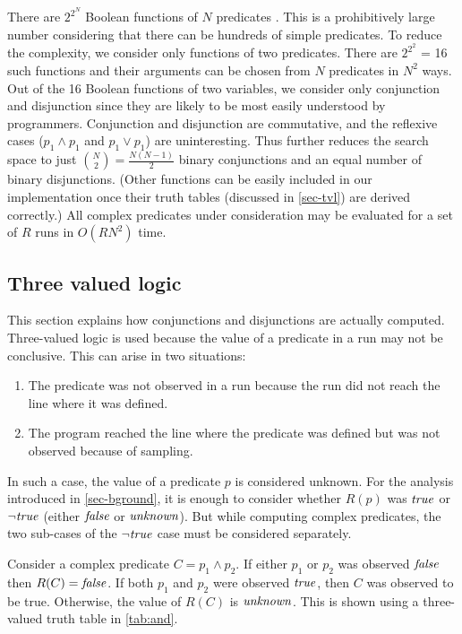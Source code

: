 There are $2^{2^N}$ Boolean functions of $N$ predicates \cite{MathWorld:BoolFuncs}.  This is a prohibitively large number considering that there can be hundreds of simple predicates.  To reduce the complexity, we consider only functions of two predicates.  There are $2^{2^2}$ = 16 such functions and their arguments can be chosen from $N$ predicates in $N^2$ ways.  Out of the 16 Boolean functions of two variables, we consider only conjunction and disjunction since they are likely to be most easily understood by programmers.  Conjunction and disjunction are commutative, and the reflexive cases ($p_1 \wedge p_1$ and $p_1 \vee p_1$) are uninteresting.  Thus further reduces the search space to just ${N \choose 2} = \frac{N (N-1)}{2}$ binary conjunctions and an equal number of binary disjunctions.  (Other functions can be easily included in our implementation once their truth tables (discussed in \autoref{sec-tvl}) are derived correctly.)  All complex predicates under consideration may be evaluated for a set of $R$ runs in $O(R N^2)$ time.

\subsection{Three valued logic}
\label{sec-tvl}
This section explains how conjunctions and disjunctions are actually computed.  Three-valued logic is used because the value of a predicate in a run may not be conclusive. This can arise in two situations:
\begin{enumerate}
\item The predicate was not observed in a run because the run did not reach the line where it was defined.
\item The program reached the line where the predicate was defined but was not observed because of sampling.
\end{enumerate}

In such a case, the value of a predicate $p$ is considered unknown.  For the analysis introduced in \autoref{sec-bground}, it is enough to consider whether $R(p)$ was $\mathit{true}$ or $\neg \mathit{true}$ (either $\mathit{false}$ or $\mathit{unknown}$).  But while computing complex predicates, the two sub-cases of the $\neg \mathit{true}$ case must be considered separately.

Consider a complex predicate $C = p_1 \wedge p_2$.  If either $p_1$ or $p_2$ was observed $\mathit{false}$ then $R(C) = \mathit{false}$.  If both $p_1$ and $p_2$ were observed $\mathit{true}$, then $C$ was observed to be true.  Otherwise, the value of $R(C)$ is $\mathit{unknown}$.  This is shown using a three-valued truth table in \autoref{tab:and}.

